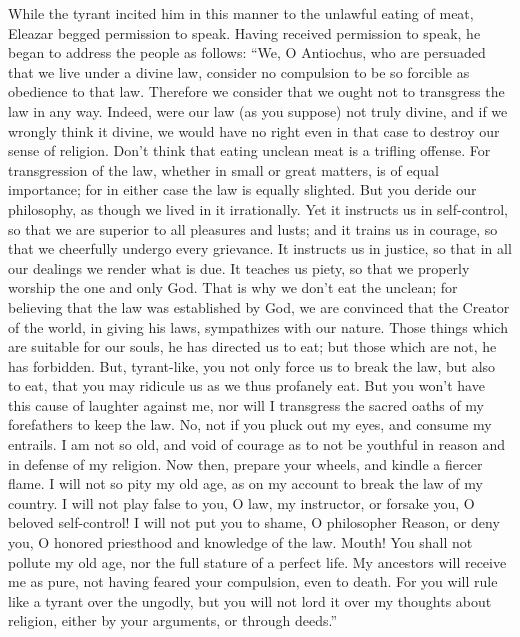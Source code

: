  While the tyrant incited him in this manner to the
unlawful eating of meat, Eleazar begged permission to speak.
 Having received permission to speak, he began to address
the people as follows:  ``We, O Antiochus, who are
persuaded that we live under a divine law, consider no compulsion to be
so forcible as obedience to that law.  Therefore we
consider that we ought not to transgress the law in any way.
 Indeed, were our law (as you suppose) not truly divine,
and if we wrongly think it divine, we would have no right even in that
case to destroy our sense of religion.  Don't think that
eating unclean meat is a trifling offense.  For
transgression of the law, whether in small or great matters, is of equal
importance;  for in either case the law is equally
slighted.  But you deride our philosophy, as though we
lived in it irrationally.  Yet it instructs us in
self-control, so that we are superior to all pleasures and lusts; and it
trains us in courage, so that we cheerfully undergo every grievance.
 It instructs us in justice, so that in all our dealings
we render what is due. It teaches us piety, so that we properly worship
the one and only God.  That is why we don't eat the
unclean; for believing that the law was established by God, we are
convinced that the Creator of the world, in giving his laws, sympathizes
with our nature.  Those things which are suitable for our
souls, he has directed us to eat; but those which are not, he has
forbidden.  But, tyrant-like, you not only force us to
break the law, but also to eat, that you may ridicule us as we thus
profanely eat.  But you won't have this cause of laughter
against me,  nor will I transgress the sacred oaths of my
forefathers to keep the law.  No, not if you pluck out my
eyes, and consume my entrails.  I am not so old, and void
of courage as to not be youthful in reason and in defense of my
religion.  Now then, prepare your wheels, and kindle a
fiercer flame.  I will not so pity my old age, as on my
account to break the law of my country.  I will not play
false to you, O law, my instructor, or forsake you, O beloved
self-control!  I will not put you to shame, O philosopher
Reason, or deny you, O honored priesthood and knowledge of the law.
 Mouth! You shall not pollute my old age, nor the full
stature of a perfect life.  My ancestors will receive me
as pure, not having feared your compulsion, even to death.
 For you will rule like a tyrant over the ungodly, but
you will not lord it over my thoughts about religion, either by your
arguments, or through deeds.''

